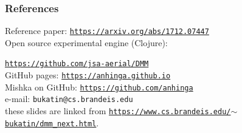 \documentclass{beamer}
\begin{document}
\begin{frame}

  \frametitle{References}

Reference paper: \href{https://arxiv.org/abs/1712.07447}{\tt\footnotesize  https://arxiv.org/abs/1712.07447}\\[2ex]

Open source experimental engine (Clojure):

\href{https://github.com/jsa-aerial/DMM}{\tt\footnotesize https://github.com/jsa-aerial/DMM}\\[2ex]

GitHub pages: \href{https://anhinga.github.io}{\tt\footnotesize  https://anhinga.github.io}\\[2ex]

Mishka on GitHub: \href{https://github.com/anhinga}{\tt\footnotesize https://github.com/anhinga}\\[2ex]

e-mail: {\tt\footnotesize bukatin@cs.brandeis.edu}\\[2ex]

these slides are linked from \href{https://www.cs.brandeis.edu/~bukatin/dmm\_next.html}{\tt\footnotesize https://www.cs.brandeis.edu/$\sim$bukatin/dmm\_next.html}.


\end{frame}
\end{document}
